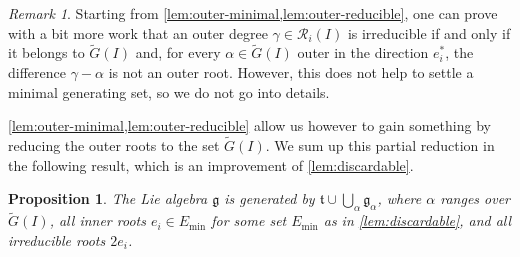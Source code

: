 \documentclass[11pt,letterpaper,reqno]{amsart}
\newtheorem{proposition}[proposition]{Proposition}
\theoremstyle{remark}
\newtheorem{remark}[remark]{Remark}
\theoremstyle{definition}
\newcommand{\R}{\mathcal R}
\begin{document}
\begin{remark}
Starting from \cref{lem:outer-minimal,lem:outer-reducible}, one can prove with a bit more work that an outer degree $\gamma\in\R_i(I)$ is irreducible if and only if it belongs to $\widetilde G(I)$ and, for every $\alpha\in\widetilde G(I)$ outer in the
direction $e_i^*$, the difference $\gamma-\alpha$ is not an outer root. However, this does not help to settle a minimal generating set, so we do not go into details.
\end{remark}

\cref{lem:outer-minimal,lem:outer-reducible} allow us however to gain something by reducing the outer roots to the set $\widetilde G(I)$. We sum up this partial reduction in the following result, which is an improvement of \cref{lem:discardable}.

\begin{proposition}\label{prop:discardable2}
The Lie algebra $\mathfrak g$ is generated by $\mathfrak t\cup\bigcup_{\alpha}\mathfrak g_\alpha$, where $\alpha$ ranges over $\widetilde G(I)$, all inner roots $e_i\in E_\mathrm{min}$ for some set $E_\mathrm{min}$ as in \cref{lem:discardable}, and all irreducible roots $2e_i$.
\end{proposition}
\end{document}
